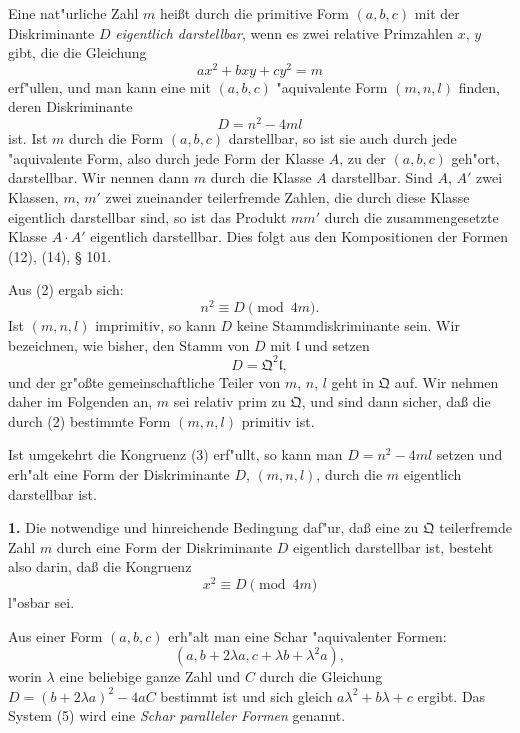 \documentclass[12pt,a4paper]{article}
\theoremstyle{plain}
\begin{document}
Eine nat"urliche Zahl $m$ hei\ss t durch die primitive Form $(a, b, c)$ mit der Diskriminante $D$ \textit{eigentlich darstellbar}, wenn es zwei relative Primzahlen $x$, $y$ gibt, die die Gleichung
\begin{equation}
ax^2 + bxy + cy^2 = m
\tag{1}
\end{equation}
erf"ullen, und man kann eine mit $(a, b, c)$ "aquivalente Form $(m, n, l)$ finden, deren Diskriminante
\begin{equation}
D = n^2 - 4ml
\tag{2}
\end{equation}
ist. Ist $m$ durch die Form $(a, b, c)$ darstellbar, so ist sie auch durch jede "aquivalente Form, also durch jede Form der Klasse $A$, zu der $(a, b, c)$ geh"ort, darstellbar. Wir nennen dann $m$ durch die Klasse $A$ darstellbar. Sind $A$, $A'$ zwei Klassen, $m$, $m'$ zwei zueinander teilerfremde Zahlen, die durch diese Klasse eigentlich darstellbar sind, so ist das Produkt $mm'$ durch die zusammengesetzte Klasse $A \cdot A'$ eigentlich darstellbar. Dies folgt aus den Kompositionen der Formen (12), (14), \S{} 101.

Aus (2) ergab sich:
\begin{equation}
n^2 \equiv D \pmod{4m}.
\tag{3}
\end{equation}
Ist $(m, n, l)$ imprimitiv, so kann $D$ keine Stammdiskriminante sein. Wir bezeichnen, wie bisher, den Stamm von $D$ mit $\mathfrak{l}$ und setzen
\[
D = \mathfrak{Q}^2\mathfrak{l},
\]
und der gr"o\ss te gemeinschaftliche Teiler von $m$, $n$, $l$ geht in $\mathfrak{Q}$ auf. Wir nehmen daher im Folgenden an, $m$ sei relativ prim zu $\mathfrak{Q}$, und sind dann sicher, da\ss{} die durch (2) bestimmte Form $(m, n, l)$ primitiv ist.

Ist umgekehrt die Kongruenz (3) erf"ullt, so kann man $D = n^2 - 4ml$ setzen und erh"alt eine Form der Diskriminante $D$, $(m, n, l)$, durch die $m$ eigentlich darstellbar ist.

\textbf{1.} Die notwendige und hinreichende Bedingung daf"ur, da\ss{} eine zu $\mathfrak{Q}$ teilerfremde Zahl $m$ durch eine Form der Diskriminante $D$ eigentlich darstellbar ist, besteht also darin, da\ss{} die Kongruenz
\begin{equation}
x^2 \equiv D \pmod{4m}
\tag{4}
\end{equation}
l"osbar sei.

Aus einer Form $(a, b, c)$ erh"alt man eine Schar "aquivalenter Formen:
\begin{equation}
(a, b + 2\lambda a, c + \lambda b + \lambda^2 a),
\tag{5}
\end{equation}
worin $\lambda$ eine beliebige ganze Zahl und $C$ durch die Gleichung $D = (b + 2\lambda a)^2 - 4aC$ bestimmt ist und sich gleich $a\lambda^2 + b\lambda + c$ ergibt. Das System (5) wird eine \textit{Schar paralleler Formen} genannt.
\end{document}
